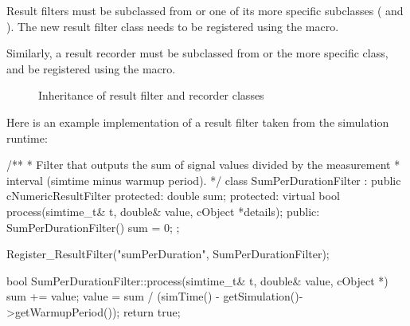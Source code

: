 Result filters must be subclassed from  or one
of its more specific subclasses ( and
). The new result filter class needs to be
registered using the  macro.

Similarly, a result recorder must be subclassed from  or
the more specific  class, and be registered
using the  macro.

\begin{figure}[ht!]
  \begin{center}
    
    \caption{Inheritance of result filter and recorder classes}
  \end{center}
\end{figure}

Here is an example implementation of a result filter taken from the simulation runtime:


\begin{cpp}
/**
 * Filter that outputs the sum of signal values divided by the measurement
 * interval (simtime minus warmup period).
 */
class SumPerDurationFilter : public cNumericResultFilter
{
    protected:
        double sum;
    protected:
        virtual bool process(simtime_t& t, double& value, cObject *details);
    public:
        SumPerDurationFilter() {sum = 0;}
};

Register_ResultFilter("sumPerDuration", SumPerDurationFilter);

bool SumPerDurationFilter::process(simtime_t& t, double& value, cObject *)
{
    sum += value;
    value = sum / (simTime() - getSimulation()->getWarmupPeriod());
    return true;
}
\end{cpp}


%
%
%
%
%


